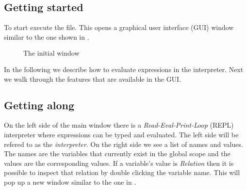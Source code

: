 \documentclass[a4,14pt,latin1]{article}
\begin{document}
\subsection{Getting started}

To start \RAS{} execute the  file. This opens a graphical
user interface (GUI) window similar to the one shown in
.

\begin{figure}
  \centering
  \caption{The initial \RAS{} window}
  \label{fig:initial_window}
\end{figure}

In the following we describe how to evaluate \RAS{} expressions in the
interpreter. Next we walk through the features that are available in
the GUI.

\subsection{Getting along}

On the left side of the main window there is a {\it
  Read-Eval-Print-Loop} (REPL) interpreter where \RAS{} expressions
can be typed and evaluated. The left side will be refered to as the
{\it interpreter}. On the right side we see a list of names and
values. The names are the variables that currently exist in the global
scope and the values are the corresponding values. If a variable's
value is {\it Relation} then it is possible to inspect that relation
by double clicking the variable name. This will pop up a new window
similar to the one in .
\end{document}
